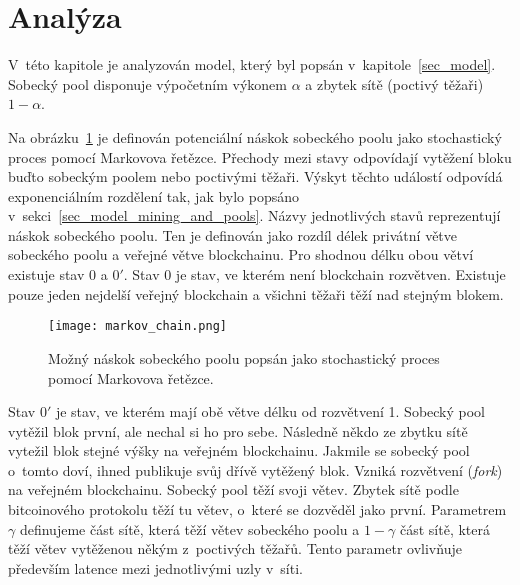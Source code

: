 
\section{Analýza}
\label{sec_analyza}

V~této kapitole je analyzován model, který byl popsán v~kapitole~\ref{sec_model}. Sobecký pool disponuje výpočetním výkonem $\alpha$ a zbytek sítě (poctivý těžaři) $1 - \alpha$.

Na obrázku~\ref{fig_markov_chain} je definován potenciální náskok sobeckého poolu jako stochastický proces pomocí Markovova řetězce. Přechody mezi stavy odpovídají vytěžení bloku buďto sobeckým poolem nebo poctivými těžaři. Výskyt těchto událostí odpovídá exponenciálním rozdělení tak, jak bylo popsáno v~sekci~\ref{sec_model_mining_and_pools}. Názvy jednotlivých stavů reprezentují náskok sobeckého poolu. Ten je definován jako rozdíl délek privátní větve sobeckého poolu a veřejné větve blockchainu. Pro shodnou délku obou větví existuje stav $0$ a $0'$. Stav $0$ je stav, ve kterém není blockchain rozvětven. Existuje pouze jeden nejdelší veřejný blockchain a všichni těžaři těží nad stejným blokem.

\begin{figure}[ht]
    \centering
    \texttt{[image: markov\_chain.png]}
    \caption{Možný náskok sobeckého poolu popsán jako stochastický proces pomocí Markovova řetězce.}
    \label{fig_markov_chain}
\end{figure}

Stav $0'$ je stav, ve kterém mají obě větve délku od rozvětvení 1. Sobecký pool vytěžil blok první, ale nechal si ho pro sebe. Následně někdo ze zbytku sítě vytežil blok stejné výšky na veřejném blockchainu. Jakmile se sobecký pool o~tomto doví, ihned publikuje svůj dřívě vytěžený blok. Vzniká rozvětvení (\textit{fork}) na veřejném blockchainu. Sobecký pool těží svoji větev. Zbytek sítě podle bitcoinového protokolu těží tu větev, o~které se dozvěděl jako první. Parametrem $\gamma$ definujeme část sítě, která těží větev sobeckého poolu a $1 - \gamma$ část sítě, která těží větev vytěženou někým z~poctivých těžařů. Tento parametr ovlivňuje především latence mezi jednotlivými uzly v~síti.

